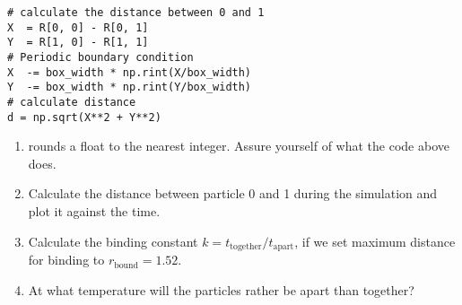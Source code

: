 \documentclass{article}
\begin{document}
\begin{lstlisting}
# calculate the distance between 0 and 1
X  = R[0, 0] - R[0, 1]
Y  = R[1, 0] - R[1, 1]
# Periodic boundary condition
X  -= box_width * np.rint(X/box_width)
Y  -= box_width * np.rint(Y/box_width)
# calculate distance
d = np.sqrt(X**2 + Y**2)
\end{lstlisting}

\begin{enumerate}[resume]
    \item {} rounds a float to the nearest integer. Assure yourself of what the code above does.

    \item Calculate the distance between particle 0 and 1 during the simulation and plot it against the  time.

    \item Calculate the binding constant $k = t_\mathrm{together} / t_\mathrm{apart}$,
        if we set maximum distance for binding to $r_\mathrm{bound} = 1.52$.

    \item At what temperature will the particles rather be apart than together?

\end{enumerate}





\end{document}
